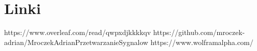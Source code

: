 \documentclass[12pt,oneside,a4paper]{book} %
\begin{document}
\chapter{Linki }

https://www.overleaf.com/read/qwpxdjkkkkqv \newline
https://github.com/mroczek-adrian/MroczekAdrianPrzetwarzanieSygnalow \newline
https://www.wolframalpha.com/  \newline
\end{document}
